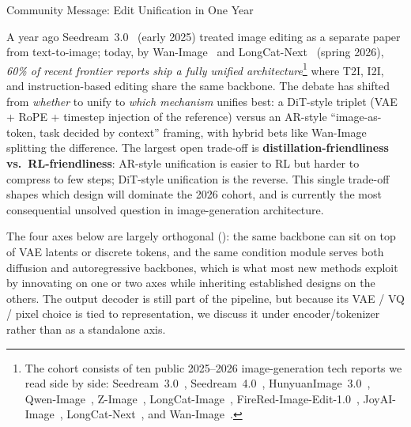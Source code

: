 \begin{highlightbox}{Community Message: Edit Unification in One Year}

A year ago Seedream~3.0~\citep{gao2025seedream} (early 2025) treated image editing as a separate paper from text-to-image; today, by Wan-Image~\citep{mao2026wan} and LongCat-Next~\citep{team2026longcat} (spring 2026), \emph{60\% of recent frontier reports ship a fully unified architecture}\footnote{The cohort consists of ten public 2025--2026 image-generation tech reports we read side by side: Seedream~3.0~\citep{gao2025seedream}, Seedream~4.0~\citep{seedream2025seedream}, HunyuanImage~3.0~\citep{cao2025hunyuanimage}, Qwen-Image~\citep{wu2025qwen}, Z-Image~\citep{cai2025z}, LongCat-Image~\citep{team2025longcat}, FireRed-Image-Edit-1.0~\citep{team2026firered}, JoyAI-Image~\citep{jdjoyaiimage}, LongCat-Next~\citep{team2026longcat}, and Wan-Image~\citep{mao2026wan}.} where T2I, I2I, and instruction-based editing share the same backbone. The debate has shifted from \emph{whether} to unify to \emph{which mechanism} unifies best: a DiT-style triplet (VAE + RoPE + timestep injection of the reference) versus an AR-style ``image-as-token, task decided by context'' framing, with hybrid bets like Wan-Image splitting the difference. The largest open trade-off is \textbf{distillation-friendliness vs.\ RL-friendliness}: AR-style unification is easier to RL but harder to compress to few steps; DiT-style unification is the reverse. This single trade-off shapes which design will dominate the 2026 cohort, and is currently the most consequential unsolved question in image-generation architecture.
\end{highlightbox}


The four axes below are largely orthogonal (): the same backbone can sit on top of VAE latents or discrete tokens, and the same condition module serves both diffusion and autoregressive backbones, which is what most new methods exploit by innovating on one or two axes while inheriting established designs on the others. The output decoder is still part of the pipeline, but because its VAE / VQ / pixel choice is tied to representation, we discuss it under encoder/tokenizer rather than as a standalone axis.

